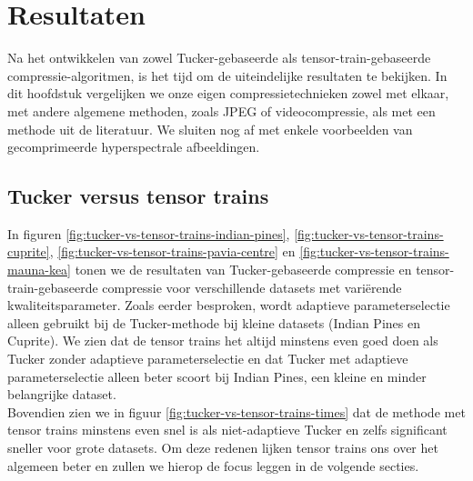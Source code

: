 \chapter{Resultaten}
\label{hoofdstuk:resultaten}

Na het ontwikkelen van zowel Tucker-gebaseerde als tensor-train-gebaseerde compressie-algoritmen, is het tijd om de uiteindelijke resultaten te bekijken. In dit hoofdstuk vergelijken we onze eigen compressietechnieken zowel met elkaar, met andere algemene methoden, zoals JPEG of videocompressie, als met een methode uit de literatuur. We sluiten nog af met enkele voorbeelden van gecomprimeerde hyperspectrale afbeeldingen.

\section{Tucker versus tensor trains}

In figuren \ref{fig:tucker-vs-tensor-trains-indian-pines}, \ref{fig:tucker-vs-tensor-trains-cuprite}, \ref{fig:tucker-vs-tensor-trains-pavia-centre} en \ref{fig:tucker-vs-tensor-trains-mauna-kea} tonen we de resultaten van Tucker-gebaseerde compressie en tensor-train-gebaseerde compressie voor verschillende datasets met vari\"erende kwaliteitsparameter. Zoals eerder besproken, wordt adaptieve parameterselectie alleen gebruikt bij de Tucker-methode bij kleine datasets (Indian Pines en Cuprite). We zien dat de tensor trains het altijd minstens even goed doen als Tucker zonder adaptieve parameterselectie en dat Tucker met adaptieve parameterselectie alleen beter scoort bij Indian Pines, een kleine en minder belangrijke dataset.\\

Bovendien zien we in figuur \ref{fig:tucker-vs-tensor-trains-times} dat de methode met tensor trains minstens even snel is als niet-adaptieve Tucker en zelfs significant sneller voor grote datasets. Om deze redenen lijken tensor trains ons over het algemeen beter en zullen we hierop de focus leggen in de volgende secties.

